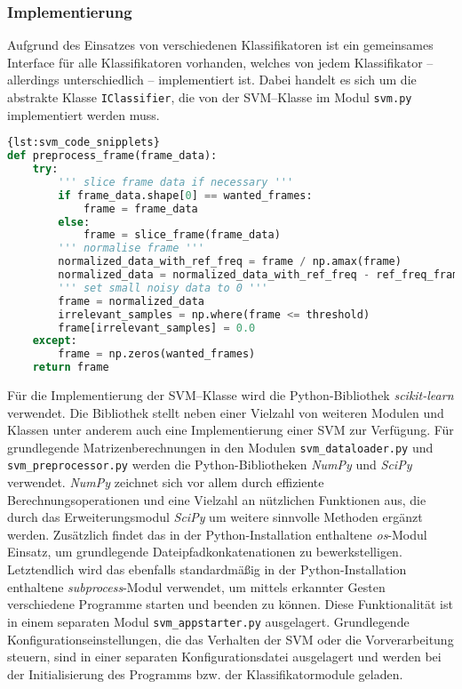 \subsubsection{Implementierung}\label{sec:svm_implementation}
Aufgrund des Einsatzes von verschiedenen Klassifikatoren ist ein gemeinsames Interface für alle Klassifikatoren vorhanden, welches von jedem Klassifikator -- allerdings unterschiedlich -- implementiert ist. 
Dabei handelt es sich um die abstrakte Klasse \texttt{IClassifier}, die von der \ac{SVM}--Klasse im Modul \texttt{svm.py} implementiert werden muss.
\begin{lstlisting}[float=*,language=Python,caption={Code Snipplet},label={lst:svm_code_snipplets}]{lst:svm_code_snipplets}
def preprocess_frame(frame_data):
	try:
		''' slice frame data if necessary '''
		if frame_data.shape[0] == wanted_frames:
			frame = frame_data
		else:
			frame = slice_frame(frame_data)
		''' normalise frame '''
		normalized_data_with_ref_freq = frame / np.amax(frame)
		normalized_data = normalized_data_with_ref_freq - ref_freq_frame
		''' set small noisy data to 0 '''
		frame = normalized_data
		irrelevant_samples = np.where(frame <= threshold)
		frame[irrelevant_samples] = 0.0
	except:
		frame = np.zeros(wanted_frames)
	return frame
\end{lstlisting}
Für die Implementierung der \ac{SVM}--Klasse wird die Python-Bibliothek \textit{scikit-learn} verwendet. 
Die Bibliothek stellt neben einer Vielzahl von weiteren Modulen und Klassen unter anderem auch eine Implementierung einer \ac{SVM} zur Verfügung.
Für grundlegende Matrizenberechnungen in den Modulen \texttt{svm\_dataloader.py} und \texttt{svm\_preprocessor.py} werden die Python-Bibliotheken \textit{NumPy} und \textit{SciPy} verwendet. 
\textit{NumPy} zeichnet sich vor allem durch effiziente Berechnungsoperationen und eine Vielzahl an nützlichen Funktionen aus, die durch das Erweiterungsmodul \textit{SciPy} um weitere sinnvolle Methoden ergänzt werden.
Zusätzlich findet das in der Python-Installation enthaltene \textit{os}-Modul Einsatz, um grundlegende Dateipfadkonkatenationen zu bewerkstelligen.
Letztendlich wird das ebenfalls standardmäßig in der Python-Installation enthaltene \textit{subprocess}-Modul verwendet, um mittels erkannter Gesten verschiedene Programme starten und beenden zu können.
Diese Funktionalität ist in einem separaten Modul \texttt{svm\_appstarter.py} ausgelagert.
Grundlegende Konfigurationseinstellungen, die das Verhalten der \ac{SVM} oder die Vorverarbeitung steuern, sind in einer separaten Konfigurationsdatei ausgelagert und werden bei der Initialisierung des Programms bzw. der Klassifikatormodule geladen.

